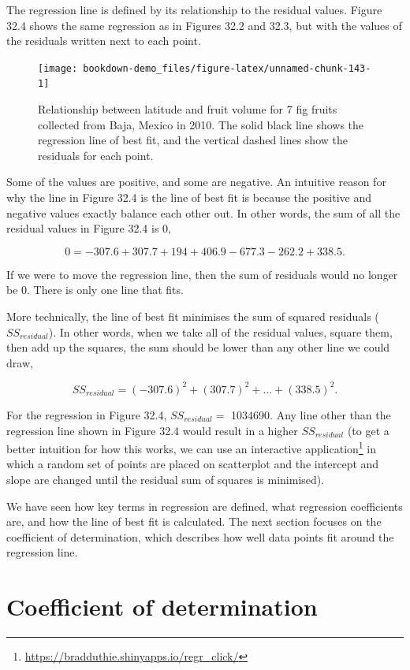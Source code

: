 \documentclass[
  openany]{krantz}
\begin{document}
The regression line is defined by its relationship to the residual values.
Figure 32.4 shows the same regression as in Figures 32.2 and 32.3, but with the values of the residuals written next to each point.

\begin{figure}
\texttt{[image: bookdown-demo\_files/figure-latex/unnamed-chunk-143-1]} \caption{Relationship between latitude and fruit volume for 7 fig fruits collected from Baja, Mexico in 2010. The solid black line shows the regression line of best fit, and the vertical dashed lines show the residuals for each point.}\label{fig:unnamed-chunk-143}
\end{figure}

Some of the values are positive, and some are negative.
An intuitive reason for why the line in Figure 32.4 is the line of best fit is because the positive and negative values exactly balance each other out.
In other words, the sum of all the residual values in Figure 32.4 is 0,

\[0 = -307.6 + 307.7 + 194 + 406.9 - 677.3 - 262.2 + 338.5.\]

If we were to move the regression line, then the sum of residuals would no longer be 0.
There is only one line that fits.

More technically, the line of best fit minimises the sum of squared residuals (\(SS_{residual}\)).
In other words, when we take all of the residual values, square them, then add up the squares, the sum should be lower than any other line we could draw,

\[SS_{residual} = (-307.6)^{2} + (307.7)^2 + ... + (338.5)^{2}.\]

For the regression in Figure 32.4, \(SS_{residual} =\) 1034690.
Any line other than the regression line shown in Figure 32.4 would result in a higher \(SS_{residual}\) (to get a better intuition for how this works, we can use an interactive application\footnote{\url{https://bradduthie.shinyapps.io/regr_click/}} in which a random set of points are placed on scatterplot and the intercept and slope are changed until the residual sum of squares is minimised).

We have seen how key terms in regression are defined, what regression coefficients are, and how the line of best fit is calculated.
The next section focuses on the coefficient of determination, which describes how well data points fit around the regression line.

\hypertarget{coefficient-of-determination}{%
\section{Coefficient of determination}\label{coefficient-of-determination}}
\end{document}
